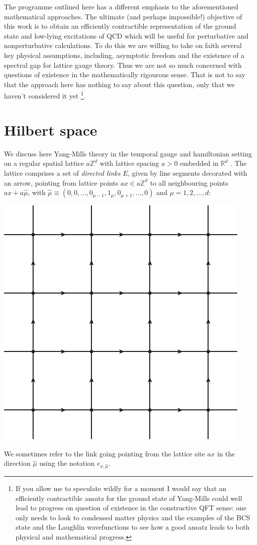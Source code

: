 \documentclass[twocolumn,lengthcheck,superscriptaddress]{revtex4-1}
\theoremstyle{definition}
\theoremstyle{remark}
\begin{document}
The programme outlined here has a different emphasis to the aforementioned mathematical approaches. The ultimate (and perhaps impossible!) objective of this work is to obtain an efficiently contractible representation of the ground state  and low-lying excitations of QCD which will be useful for perturbative and nonperturbative calculations. To do this we are willing to take on faith several key physical assumptions, including, asymptotic freedom and the existence of a spectral gap for lattice gauge theory. Thus we are not so much concerned with questions of existence in the mathematically rigourous sense. That is not to say that the approach here has nothing to say about this question, only that we haven't considered it yet \footnote{If you allow me to speculate wildly for a moment I would say that an efficiently contractible ansatz for the ground state of Yang-Mills could well lead to progress on question of existence in the constructive QFT sense: one only needs to look to condensed matter physics and the examples of the BCS state and the Laughlin wavefunctions to see how a good ansatz leads to both physical and mathematical progress.}. 

\section{Hilbert space}
We discuss here Yang-Mills theory in the temporal gauge and hamiltonian setting on a regular spatial lattice $a\mathbb{Z}^d$ with lattice spacing $a > 0$ embedded in $\mathbb{R}^d$ \cite{kogut:1975a}. The lattice comprises a set of \emph{directed links} $E$, given by line segments decorated with an arrow, pointing from lattice points $ax\in a\mathbb{Z}^d$ to all neighbouring points $ax+a\widehat{\mu}$, with $\widehat{\mu} \equiv (0, 0, \ldots, 0_{\mu-1}, 1_\mu, 0_{\mu+1}, \ldots, 0)$ and $\mu = 1, 2, \ldots, d$:
\begin{center}
	\includegraphics{basiclattice.pdf}
\end{center}
We sometimes refer to the link going pointing from the lattice site $ax$ in the direction $\widehat{\mu}$ using the notation $e_{x,\widehat{\mu}}$.
\end{document}
